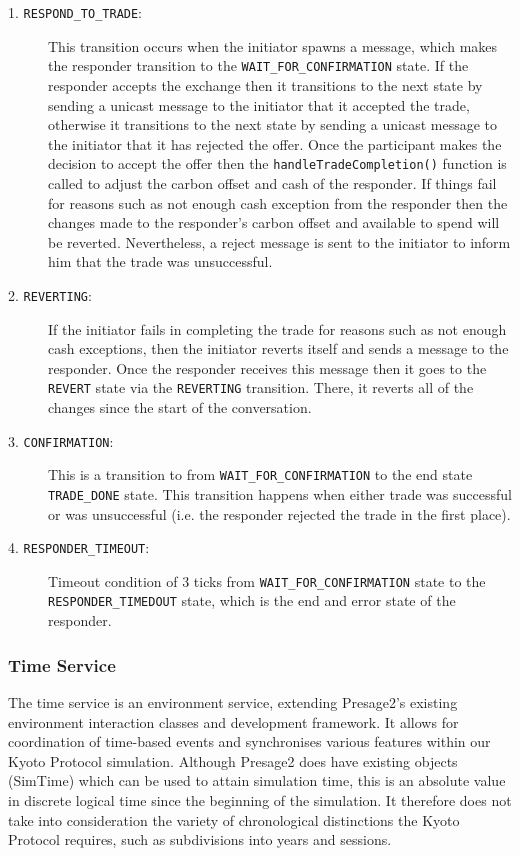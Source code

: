 \begin{description}
\item[1. \texttt{RESPOND\_TO\_TRADE}:]
This transition occurs when the initiator spawns a message, which makes the responder transition to the \texttt{WAIT\_FOR\_CONFIRMATION} state. If the responder accepts the exchange then it transitions to the next state by sending a unicast message to the initiator that it accepted the trade, otherwise it transitions to the next state by sending a unicast message to the initiator that it has rejected the offer. Once the participant makes the decision to accept the offer then the \texttt{handleTradeCompletion()} function is called to adjust the carbon offset and cash of the responder. If things fail for reasons such as not enough cash exception from the responder then the changes made to the responder’s carbon offset and available to spend will be reverted. Nevertheless, a reject message is sent to the initiator to inform him that the trade was unsuccessful.
\item[2. \texttt{REVERTING}:]
If the initiator fails in completing the trade for reasons such as not enough cash exceptions, then the initiator reverts itself and sends a message to the responder. Once the responder receives this message then it goes to the \texttt{REVERT} state via the \texttt{REVERTING} transition. There, it reverts all of the changes since the start of the conversation.
\item[3. \texttt{CONFIRMATION}:]
This is a transition to from \texttt{WAIT\_FOR\_CONFIRMATION} to the end state \texttt{TRADE\_DONE} state. This transition happens when either trade was successful or was unsuccessful (i.e. the responder rejected the trade in the first place).
\item[4. \texttt{RESPONDER\_TIMEOUT}:]
Timeout condition of 3 ticks from \texttt{WAIT\_FOR\_CONFIRMATION} state to the \texttt{RESPONDER\_TIMEDOUT} state, which is the end and error state of the responder.
\end{description}

\subsubsection{Time Service}

The time service is an environment service, extending Presage2's existing environment interaction classes and development framework. It allows for coordination of time-based events and synchronises various features within our Kyoto Protocol simulation. Although Presage2 does have existing objects (SimTime) which can be used to attain simulation time, this is an absolute value in discrete logical time since the beginning of the simulation. It therefore does not take into consideration the variety of chronological distinctions the Kyoto Protocol requires, such as subdivisions into years and sessions.

